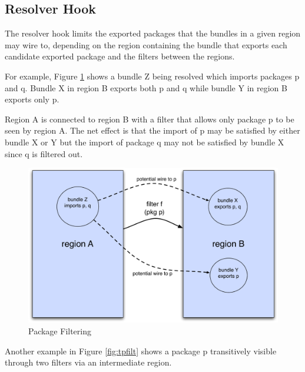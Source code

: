 \documentclass[a4paper,9pt]{article}
\begin{document}
\subsection{Resolver Hook}

The resolver hook limits the exported packages that the bundles in a given region may wire to, depending on
the region containing the bundle that exports each candidate exported package and the filters between the
regions.

For example, Figure \ref{fig:pfilt} shows a bundle Z being resolved which imports packages p and q. Bundle X
in region B exports both p and q while bundle Y in region B exports only p.

Region A is connected to region B with a filter that allows only package p to be seen by region A.
The net effect is that the import of p may be satisfied by either bundle X or Y but the import of package q may not
be satisfied by bundle X since q is filtered out.
\begin{figure}[h!]
\begin{center}
\includegraphics*[scale=0.4]{package-filtering.pdf}
\caption{Package Filtering}
\end{center}
\label{fig:pfilt}
\end{figure}

Another example in Figure \ref{fig:tpfilt} shows a package p transitively visible through two filters via an
intermediate region.
\end{document}
